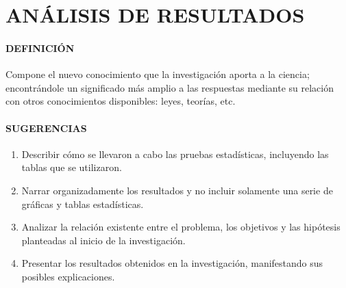 \section{ANÁLISIS DE RESULTADOS}

\paragraph{DEFINICIÓN}
Compone el nuevo conocimiento que la investigación aporta a la ciencia; encontrándole un significado más amplio a las respuestas mediante su relación con otros conocimientos disponibles: leyes, teorías, etc.

\paragraph{SUGERENCIAS}

\begin{enumerate}
 \item Describir cómo se llevaron a cabo las pruebas estadísticas, incluyendo las tablas que se utilizaron.
 \item Narrar organizadamente los resultados y no incluir solamente una serie de gráficas y tablas estadísticas.
 \item Analizar la relación existente entre el problema, los objetivos y las hipótesis planteadas al inicio de la investigación.
 \item Presentar los resultados obtenidos en la investigación, manifestando sus posibles explicaciones.
\end{enumerate}